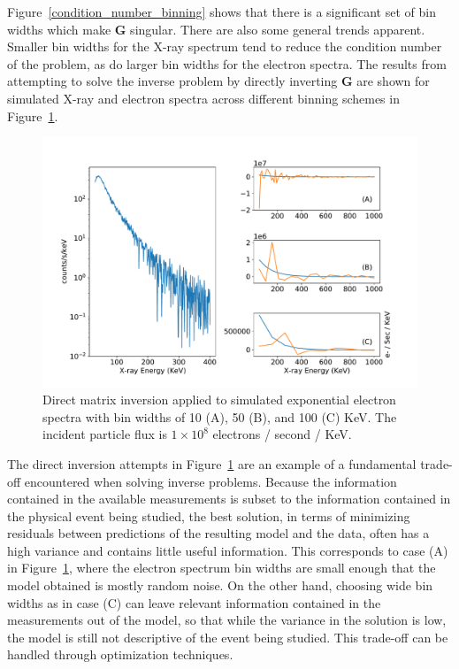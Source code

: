 Figure~\ref{condition_number_binning} shows that there is a significant set of bin widths which make $\mathbf{G}$ singular. There are also some general trends apparent. Smaller bin widths for the X-ray spectrum tend to reduce the condition number of the problem, as do larger bin widths for the electron spectra. The results from attempting to solve the inverse problem by directly inverting $\mathbf{G}$ are shown for simulated X-ray and electron spectra across different binning schemes in Figure~\ref{direct_inversion_example}.

\begin{figure}[h]
\label{direct_inversion_example}
\centering
\includegraphics[width=1.0\textwidth]{figures/chapter_4/direct_inversion_example/fig.pdf}
\caption{Direct matrix inversion applied to simulated exponential electron spectra with bin widths of 10 (A), 50 (B), and 100 (C) KeV. The incident particle flux is $1\times10^8$ electrons / second / KeV. }
\end{figure}

The direct inversion attempts in Figure~\ref{direct_inversion_example} are an example of a fundamental trade-off encountered when solving inverse problems. Because the information contained in the available measurements is subset to the information contained in the physical event being studied, the best solution, in terms of minimizing residuals between predictions of the resulting model and the data, often has a high variance and contains little useful information. This corresponds to case (A) in Figure~\ref{direct_inversion_example}, where the electron spectrum bin widths are small enough that the model obtained is mostly random noise. On the other hand, choosing wide bin widths as in case (C) can leave relevant information contained in the measurements out of the model, so that while the variance in the solution is low, the model is still not descriptive of the event being studied. This trade-off can be handled through optimization techniques.

